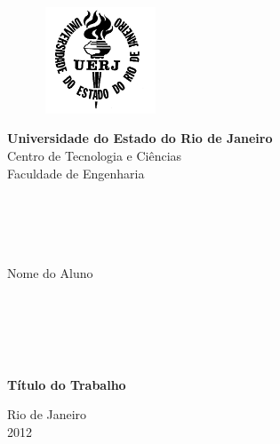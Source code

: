 \begin{titlepage}
\begin{center}

	\vspace{-0.5cm}

  \begin{figure}[hbt!]
		\begin{flushleft}
		   \includegraphics[width=3.44cm,height=3.17cm]{./01_Pre_textuais/figures/logo_uerj_pb.png}
		\end{flushleft}
	\end{figure}
	\vspace{-4cm}

  \hspace{2cm}\large{\textbf{Universidade do Estado do Rio de Janeiro}}\\
  \hspace{2cm}\large{Centro de Tecnologia e Ciências}\\
  \hspace{2cm}\large{Faculdade de Engenharia}\\

  \hspace{2cm}\large{}\\
  \hspace{2cm}\large{}\\
  \hspace{2cm}\large{}\\
  \hspace{2cm}\large{}\\

  \par
  \large{Nome do Aluno}

  \hspace{2cm}\large{}\\
  \hspace{2cm}\large{}\\
  \hspace{2cm}\large{}\\
  \hspace{2cm}\large{}\\


  \par
  \large\textbf{Título do Trabalho}


  \par\vfill
  Rio de Janeiro\\2012

\end{center}
\end{titlepage}